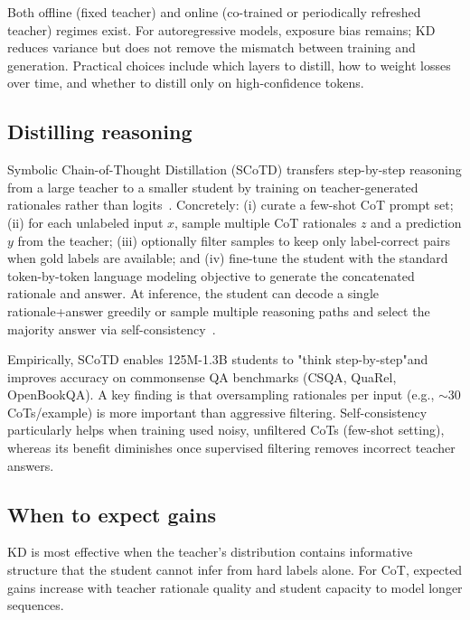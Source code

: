 Both offline (fixed teacher) and online (co-trained or periodically refreshed teacher) regimes exist. For autoregressive models, exposure bias remains; KD reduces variance but does not remove the mismatch between training and generation. Practical choices include which layers to distill, how to weight losses over time, and whether to distill only on high-confidence tokens.

\subsection{Distilling reasoning}
Symbolic Chain-of-Thought Distillation (SCoTD) transfers step-by-step reasoning from a large teacher to a smaller student by training on teacher-generated rationales rather than logits~\cite{li2024symbolicchainofthoughtdistillationsmall}. Concretely: (i) curate a few-shot CoT prompt set; (ii) for each unlabeled input $x$, sample multiple CoT rationales $z$ and a prediction $y$ from the teacher; (iii) optionally filter samples to keep only label-correct pairs when gold labels are available; and (iv) fine-tune the student with the standard token-by-token language modeling objective to generate the concatenated rationale and answer. At inference, the student can decode a single rationale+answer greedily or sample multiple reasoning paths and select the majority answer via self-consistency~\cite{wang2023selfconsistencyimproveschainthought}.

Empirically, SCoTD enables 125M-1.3B students to "think step-by-step"and improves accuracy on commonsense QA benchmarks (CSQA, QuaRel, OpenBookQA). A key finding is that oversampling rationales per input (e.g., $\sim$30 CoTs/example) is more important than aggressive filtering. Self-consistency particularly helps when training used noisy, unfiltered CoTs (few-shot setting), whereas its benefit diminishes once supervised filtering removes incorrect teacher answers.

\subsection{When to expect gains}
KD is most effective when the teacher's distribution contains informative structure that the student cannot infer from hard labels alone. For CoT, expected gains increase with teacher rationale quality and student capacity to model longer sequences.

